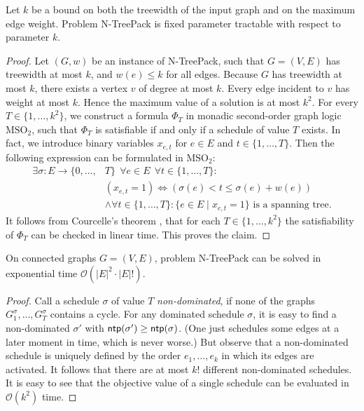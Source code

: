 \documentclass[runningheads]{llncs}
\newcommand{\set}[1]{\{ #1 \}}
\newcommand{\bigO}{\mathcal{O}}
\DeclareMathOperator{\ntp}{\text{\sf ntp}}
\newcommand{\xxxNTP}{{\sc N-TreePack}}
\begin{document}
\begin{theorem}
Let $k$ be a bound on both the treewidth of the input graph and on the maximum edge weight.
Problem {\xxxNTP} is fixed parameter tractable with respect to parameter $k$.
\end{theorem}
\begin{proof}
Let $(G, w)$ be an instance of {\xxxNTP}, such that $G = (V, E)$ has treewidth at most $k$, and $w(e) \leq k$ for all edges. Because $G$ has treewidth at most $k$, there exists a vertex $v$ of degree at most $k$. Every edge incident to $v$ has weight at most $k$. Hence the maximum value of a solution is at most $k^2$. For every $T \in \{1,\dots,k^2\}$, we construct a formula $\Phi_T$ in monadic second-order graph logic $\text{MSO}_2$, such that $\Phi_T$ is satisfiable if and only if a schedule of value $T$ exists. In fact, we introduce binary variables $x_{e,t}$ for $e \in E$ and $t \in \{1,\dots,T\}$. Then the following expression can be formulated in $\text{MSO}_2$:
\begin{align*}
\exists \sigma: E\to\{0,\ldots,&T\} ~~\forall e\in E ~~\forall t\in\{1,\ldots,T\}: \\
& (x_{e,t}=1) \iff \left(\sigma(e) < t \leq \sigma(e) + w(e)\right)\\
& \land \forall t\in\{1,\ldots,T\}: \set{e\in E \mid x_{e,t} = 1} \text{ is a spanning tree.}
\end{align*}
It follows from Courcelle's theorem \cite{courcelle1990monadic}, that for each $T\in\{1,\dots,k^2\}$ the 
satisfiability of $\Phi_T$ can be checked in linear time. This proves the claim.
\end{proof}

\begin{theorem}
\label{th:exact}
On connected graphs $G=(V,E)$, problem {\xxxNTP} can be solved in exponential time $\bigO(|E|^2\cdot|E|!)$.
\end{theorem}
\begin{proof}
Call a schedule $\sigma$ of value $T$ \emph{non-dominated}, if none of the graphs 
$G_1^\sigma, \dots, G_T^\sigma$ contains a cycle. 
For any dominated schedule $\sigma$, it is easy to find a non-dominated $\sigma'$ with $\ntp(\sigma')\ge\ntp(\sigma)$. 
(One just schedules some edges at a later moment in time, which is never worse.) 
But observe that a non-dominated schedule is uniquely defined by the order $e_1, \dots, e_k$ 
in which its edges are activated. 
It follows that there are at most $k!$ different non-dominated schedules. 
It is easy to see that the objective value of a single schedule can be evaluated in $\bigO(k^2)$ time. 
\end{proof}
\end{document}
